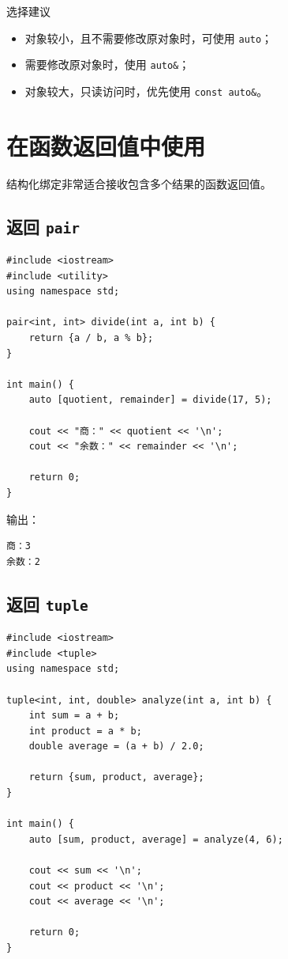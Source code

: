 \documentclass[UTF8,12pt,a4paper]{ctexart}
\begin{document}
\begin{conceptbox}{选择建议}
\begin{itemize}
    \item 对象较小，且不需要修改原对象时，可使用 \texttt{auto}；
    \item 需要修改原对象时，使用 \texttt{auto\&}；
    \item 对象较大，只读访问时，优先使用 \texttt{const auto\&}。
\end{itemize}
\end{conceptbox}

\section{在函数返回值中使用}

结构化绑定非常适合接收包含多个结果的函数返回值。

\subsection{返回 \texttt{pair}}

\begin{lstlisting}
#include <iostream>
#include <utility>
using namespace std;

pair<int, int> divide(int a, int b) {
    return {a / b, a % b};
}

int main() {
    auto [quotient, remainder] = divide(17, 5);

    cout << "商：" << quotient << '\n';
    cout << "余数：" << remainder << '\n';

    return 0;
}
\end{lstlisting}

输出：

\begin{verbatim}
商：3
余数：2
\end{verbatim}

\subsection{返回 \texttt{tuple}}

\begin{lstlisting}
#include <iostream>
#include <tuple>
using namespace std;

tuple<int, int, double> analyze(int a, int b) {
    int sum = a + b;
    int product = a * b;
    double average = (a + b) / 2.0;

    return {sum, product, average};
}

int main() {
    auto [sum, product, average] = analyze(4, 6);

    cout << sum << '\n';
    cout << product << '\n';
    cout << average << '\n';

    return 0;
}
\end{lstlisting}
\end{document}
